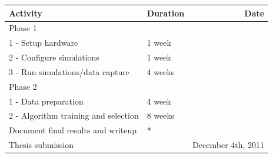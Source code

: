 \documentclass{ecuthesis}
\begin{document}
\begin{tabular}{llr}
\toprule
Activity & Duration & Date \\
\midrule
Phase 1 \\
1 - Setup hardware & 1 week \\
2 - Configure simulations & 1 week \\
3 - Run simulations/data capture & 4 weeks \\
Phase 2 \\
1 - Data preparation & 4 week \\
2 - Algorithm training and selection & 8 weeks \\
Document final results and writeup & * \\
\midrule
Thesis submission & & December 4th, 2011 \\
\bottomrule
\end{tabular}


\end{document}
